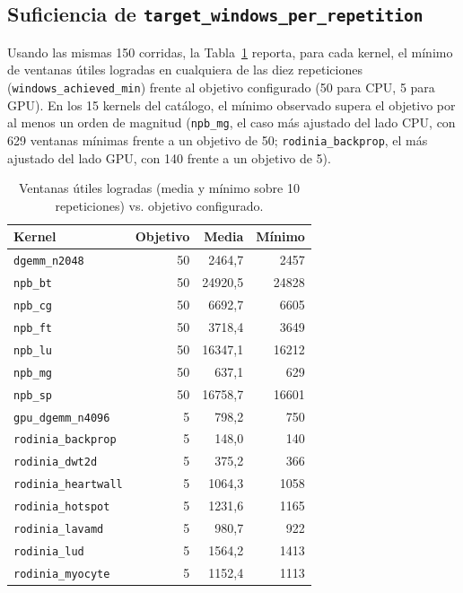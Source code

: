 \subsection{Suficiencia de \texttt{target\_windows\_per\_repetition}}

Usando las mismas 150 corridas, la Tabla~\ref{tab:target-windows} reporta,
para cada kernel, el mínimo de ventanas útiles logradas en cualquiera de
las diez repeticiones (\texttt{windows\_achieved\_min}) frente al objetivo
configurado (50 para CPU, 5 para GPU). En los 15 kernels del catálogo, el
mínimo observado supera el objetivo por al menos un orden de magnitud
(\texttt{npb\_mg}, el caso más ajustado del lado CPU, con 629 ventanas
mínimas frente a un objetivo de 50; \texttt{rodinia\_backprop}, el más
ajustado del lado GPU, con 140 frente a un objetivo de 5).

\begin{table}[H]
\centering
\caption{Ventanas útiles logradas (media y mínimo sobre 10 repeticiones) vs. objetivo configurado.}
\label{tab:target-windows}
\small
\begin{tabular}{@{}lrrr@{}}
\toprule
\textbf{Kernel} & \textbf{Objetivo} & \textbf{Media} & \textbf{Mínimo} \\
\midrule
\texttt{dgemm\_n2048} & 50 & 2464{,}7 & 2457 \\
\texttt{npb\_bt} & 50 & 24920{,}5 & 24828 \\
\texttt{npb\_cg} & 50 & 6692{,}7 & 6605 \\
\texttt{npb\_ft} & 50 & 3718{,}4 & 3649 \\
\texttt{npb\_lu} & 50 & 16347{,}1 & 16212 \\
\texttt{npb\_mg} & 50 & 637{,}1 & 629 \\
\texttt{npb\_sp} & 50 & 16758{,}7 & 16601 \\
\midrule
\texttt{gpu\_dgemm\_n4096} & 5 & 798{,}2 & 750 \\
\texttt{rodinia\_backprop} & 5 & 148{,}0 & 140 \\
\texttt{rodinia\_dwt2d} & 5 & 375{,}2 & 366 \\
\texttt{rodinia\_heartwall} & 5 & 1064{,}3 & 1058 \\
\texttt{rodinia\_hotspot} & 5 & 1231{,}6 & 1165 \\
\texttt{rodinia\_lavamd} & 5 & 980{,}7 & 922 \\
\texttt{rodinia\_lud} & 5 & 1564{,}2 & 1413 \\
\texttt{rodinia\_myocyte} & 5 & 1152{,}4 & 1113 \\
\bottomrule
\end{tabular}
\end{table}

